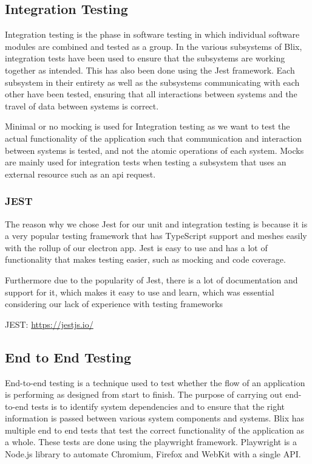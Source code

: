 \documentclass[11pt,a4paper]{article}
\begin{document}
\subsection*{Integration Testing}

Integration testing is the phase in software testing in which individual
software modules are combined and tested as a group. In the various subsystems
of Blix, integration tests have been used to ensure that the subsystems are
working together as intended. This has also been done using the Jest framework.
Each subsystem in their entirety as well as the subsystems communicating with
each other have been tested, ensuring that all interactions between systems and
the travel of data between systems is correct.

Minimal or no mocking is used for Integration testing as we want to test the
actual functionality of the application such that communication and interaction
between systems is tested, and not the atomic operations of each system. Mocks
are mainly used for integration tests when testing a subsystem that uses an
external resource such as an api request. 


\subsubsection*{JEST}

The reason why we chose Jest for our unit and integration testing is because it
is a very popular testing framework that has TypeScript support and meshes
easily with the rollup of our electron app. Jest is easy to use and has a lot of
functionality that makes testing easier, such as mocking and code coverage.

Furthermore due to the popularity of Jest, there is a lot of documentation and
support for it, which makes it easy to use and learn, which was essential
considering our lack of experience with testing frameworks

JEST: \href{https://jestjs.io/}{https://jestjs.io/}

\subsection*{End to End Testing}

End-to-end testing is a technique used to test whether the flow of an
application is performing as designed from start to finish. The purpose of
carrying out end-to-end tests is to identify system dependencies and to ensure
that the right information is passed between various system components and
systems. Blix has multiple end to end tests that test the correct functionality
of the application as a whole. These tests are done using the playwright
framework. Playwright is a Node.js library to automate Chromium, Firefox and
WebKit with a single API. 
\end{document}
